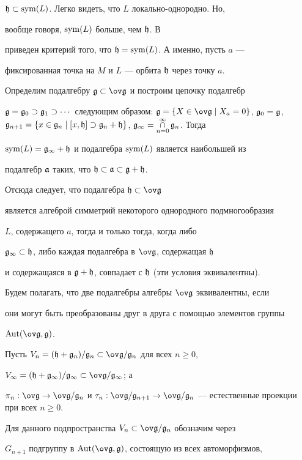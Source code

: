 $\frak h\subset\operatorname{sym}(L)$. Легко видеть, что $L$ локально-однородно. Но,


вообще говоря, $\operatorname{sym}(L)$ больше, чем $\frak h$. В \cite{nr:nk}


приведен критерий того, что $\frak h=\operatorname{sym}(L)$. А именно, пусть $a$ ---


фиксированная точка на $M$ и $L$ --- орбита $\frak h$ через точку $a$.


Определим подалгебру $\g\subset\gb$ и построим цепочку подалгебр


$\g=\g_0\supset\g_1\supset\dotsb$ следующим образом: $\g=\{X\in\gb\mid


X_a=0\}$, $\g_0=\g$, $\g_{n+1}=\{x\in\g_n\mid [x,\h]\supset


\g_n+\h\}$, $\g_{\infty}=\mathop{\cap}\limits_{n=0}^{\infty}\g_n$. Тогда


$\operatorname{sym}(L)=\frak g_{\infty}+\frak h$ и подалгебра $\operatorname{sym}(L)$ является наибольшей из


подалгебр $\frak a$ таких, что $\frak h\subset\frak a\subset\frak g+\frak h$. 


Отсюда следует, что подалгебра $\h\subset\gb$


является алгеброй симметрий некоторого однородного подмногообразия


$L$, содержащего $a$, тогда и только тогда, когда либо


$\frak g_\infty\subset\frak h$, либо каждая подалгебра в $\gb$, содержащая $\frak h$


и содержащаяся в $\frak g+\frak h$, совпадает с $\frak h$ (эти условия эквивалентны).





Будем полагать, что две подалгебры алгебры $\gb$ эквивалентны, если


они могут быть преобразованы друг в друга с помощью элементов группы


$\Aut(\gb,\g)$.





Пусть $V_n=(\h+\g_n)/\g_n\subset\gb/\g_n$ для всех $n\ge0$,


$V_\infty=(\h+\g_\infty)/\g_\infty\subset\gb/\g_\infty$; а


$\pi_n: \gb\to\gb/\g_n$ и $\tau_n:


\gb/\g_{n+1}\to\gb/\g_{n}$ --- естественные проекции при всех $n\ge0$.


Для данного подпространства $V_n\subset\gb/\g_n$ обозначим через


$G_{n+1}$ подгруппу в $\Aut(\gb,\g)$, состоящую из всех автоморфизмов,


